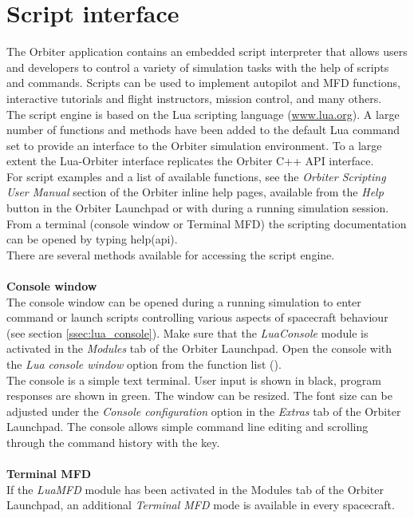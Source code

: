 \documentclass[Orbiter User Manual.tex]{subfiles}
\begin{document}
\section{Script interface}
\label{sec:script}
The Orbiter application contains an embedded script interpreter that allows users and developers to control a variety of simulation tasks with the help of scripts and commands. Scripts can be used to implement autopilot and MFD functions, interactive tutorials and flight instructors, mission control, and many others.\\
The script engine is based on the Lua scripting language (\url{www.lua.org}). A large number of functions and methods have been added to the default Lua command set to provide an interface to the Orbiter simulation environment. To a large extent the Lua-Orbiter interface replicates the Orbiter C++ API interface.\\
For script examples and a list of available functions, see the \textit{Orbiter Scripting User Manual} section of the Orbiter inline help pages, available from the \textit{Help} button in the Orbiter Launchpad or with \Alt{} during a running simulation session. From a terminal (console window or Terminal MFD) the scripting documentation can be opened by typing help(api).\\
There are several methods available for accessing the script engine.\\
\\
\textbf{Console window}\\
The console window can be opened during a running simulation to enter command or launch scripts controlling various aspects of spacecraft behaviour (see section \ref{ssec:lua_console}). Make sure that the \textit{LuaConsole} module is activated in the \textit{Modules} tab of the Orbiter Launchpad. Open the console with the \textit{Lua console window} option from the function list (\Ctrl{}).\\
The console is a simple text terminal. User input is shown in black, program responses are shown in green. The window can be resized. The font size can be adjusted under the \textit{Console configuration} option in the \textit{Extras} tab of the Orbiter Launchpad. The console allows simple command line editing and scrolling through the command history with the \UArrow key.\\
\\
\textbf{Terminal MFD}\\
If the \textit{LuaMFD} module has been activated in the Modules tab of the Orbiter Launchpad, an additional \textit{Terminal MFD} mode is available in every spacecraft.\\
\end{document}

